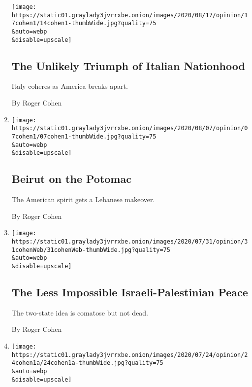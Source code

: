 \begin{enumerate}
  \texttt{[image: https://static01.graylady3jvrrxbe.onion/images/2020/08/17/opinion/17cohen1/14cohen1-thumbWide.jpg?quality=75\\\&auto=webp\\\&disable=upscale]}

  \hypertarget{the-unlikely-triumph-of-italian-nationhood}{%
  \subsection{The Unlikely Triumph of Italian
  Nationhood}\label{the-unlikely-triumph-of-italian-nationhood}}

  Italy coheres as America breaks apart.

  By Roger Cohen
\item
  \href{/2020/08/07/opinion/beirut-explosion.html}{}

  \texttt{[image: https://static01.graylady3jvrrxbe.onion/images/2020/08/07/opinion/07cohen1/07cohen1-thumbWide.jpg?quality=75\\\&auto=webp\\\&disable=upscale]}

  \hypertarget{beirut-on-the-potomac}{%
  \subsection{Beirut on the Potomac}\label{beirut-on-the-potomac}}

  The American spirit gets a Lebanese makeover.

  By Roger Cohen
\item
  \href{/2020/07/31/opinion/israeli-palestinian-peace.html}{}

  \texttt{[image: https://static01.graylady3jvrrxbe.onion/images/2020/07/31/opinion/31cohenWeb/31cohenWeb-thumbWide.jpg?quality=75\\\&auto=webp\\\&disable=upscale]}

  \hypertarget{the-less-impossible-israeli-palestinian-peace}{%
  \subsection{The Less Impossible Israeli-Palestinian
  Peace}\label{the-less-impossible-israeli-palestinian-peace}}

  The two-state idea is comatose but not dead.

  By Roger Cohen
\item
  \href{/2020/07/24/opinion/trump-germany.html}{}

  \texttt{[image: https://static01.graylady3jvrrxbe.onion/images/2020/07/24/opinion/24cohen1a/24cohen1a-thumbWide.jpg?quality=75\\\&auto=webp\\\&disable=upscale]}

  \hypertarget{american-catastrophe-through-german-eyes}{%
}
\end{enumerate}
